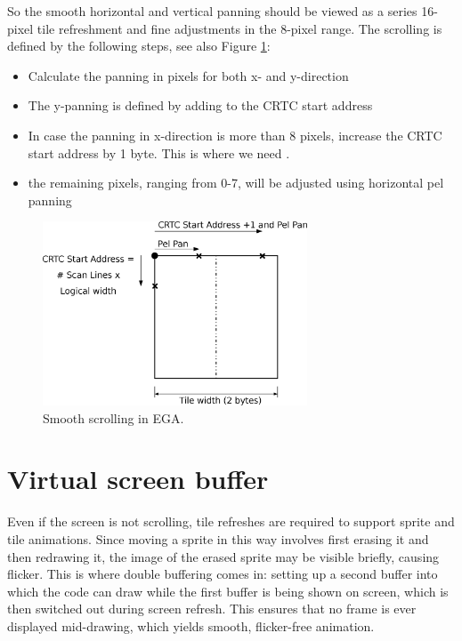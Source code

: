 \documentclass[book.tex]{subfiles}
\begin{document}
So the smooth horizontal and vertical panning should be viewed as a series 16-pixel tile refreshment and fine adjustments in the 8-pixel range. The scrolling is defined by the following steps, see also Figure \ref{fig:tile_refresh}:
\begin{itemize}
  \item Calculate the panning in pixels for both x- and y-direction
  \item The y-panning is defined by adding  to the CRTC start address
  \item In case the panning in x-direction is more than 8 pixels, increase the CRTC start address by 1 byte. This is where we need .
  \item the remaining pixels, ranging from 0-7, will be adjusted using horizontal pel panning
\end{itemize}


\begin{figure}[H]
\centering
\includegraphics[width=0.7\textwidth]{imgs/drawings/Tile_Refresh.eps}
\caption{Smooth scrolling in EGA.}
\label{fig:tile_refresh}
\end{figure}






\section{Virtual screen buffer}
Even if the screen is not scrolling, tile refreshes are required to support sprite and tile animations. Since moving a sprite in this way involves first erasing it and then redrawing it, the image of the erased sprite may be visible briefly, causing flicker. This is where double buffering comes in: setting up a second buffer into which the code can draw while the first buffer is being shown on screen, which is then switched out during screen refresh. This ensures that no frame is ever displayed mid-drawing, which yields smooth, flicker-free animation.\\
\end{document}
